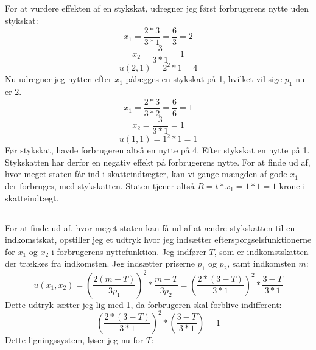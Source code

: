 \documentclass{article}
\begin{document}
\subsection{}
For at vurdere effekten af en stykskat, udregner jeg først forbrugerens nytte uden stykskat:
\begin{equation}
    x_1=\frac{2*3}{3*1}=\frac{6}{3}=2
\end{equation}
\begin{equation}
    x_2=\frac{3}{3*1}=1
\end{equation}
\begin{equation}
    u(2,1)=2^2*1=4
\end{equation}
Nu udregner jeg nytten efter $x_1$ pålægges en stykskat på 1, hvilket vil sige $p_1$ nu er 2. 
\begin{equation}
    x_1=\frac{2*3}{3*2}=\frac{6}{6}=1
\end{equation}
\begin{equation}
    x_2=\frac{3}{3*1}=1
\end{equation}
\begin{equation}
    u(1,1)=1^2*1=1
\end{equation}
Før stykskat, havde forbrugeren altså en nytte på 4. Efter stykskat en nytte på 1. Stykskatten har derfor en negativ effekt på forbrugerens nytte. For at finde ud af, hvor meget staten får ind i skatteindtægter, kan vi gange mængden af gode $x_1$ der forbruges, med stykskatten. Staten tjener altså $R=t*x_1=1*1=1$ krone i skatteindtægt.

\subsection{}
For at finde ud af, hvor meget staten kan få ud af at ændre stykskatten til en indkomstskat, opstiller jeg et udtryk hvor jeg indsætter efterspørgselsfunktionerne for $x_1$ og $x_2$ i forbrugerens nyttefunktion. Jeg indfører $T$, som er indkomstskatten der trækkes fra indkomsten. Jeg indsætter priserne $p_1$ og $p_2$, samt indkomsten $m$:
$$
u\left(x_1, x_2 \right)=\left(\frac{2(m-T)}{3 p_1}\right)^2 * \frac{m-T}{3 p_2}=\left(\frac{2 *(3-T)}{3 * 1}\right)^2 * \frac{3-T}{3 * 1}
$$
Dette udtryk sætter jeg lig med 1, da forbrugeren skal forblive indifferent: 
$$
\left(\frac{2 *(3-T)}{3 * 1}\right)^2 *\left(\frac{3-T}{3 * 1}\right)=1
$$
Dette ligningssystem, løser jeg nu for $T$:
\end{document}
